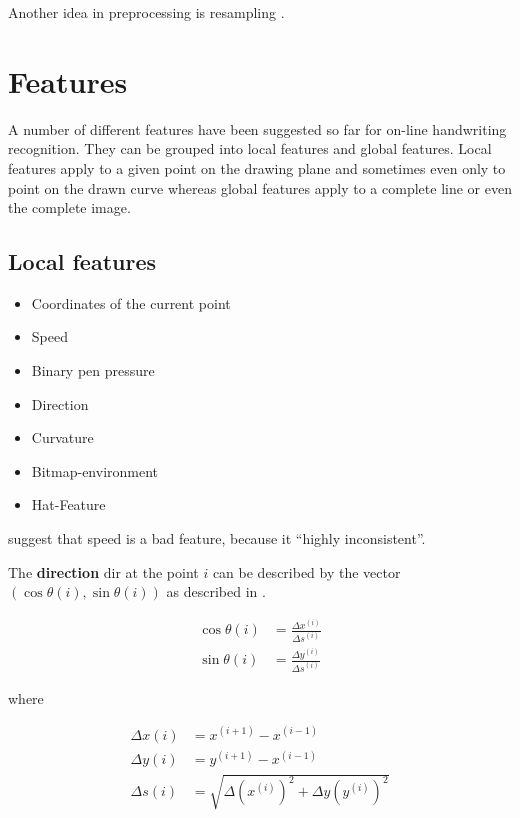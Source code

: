 Another idea in preprocessing is resampling \cite{Guyon1991,ICASSP-94}.

\section{Features}\label{sec:features}
A number of different features have been suggested so far for on-line handwriting
recognition. They can be grouped into local features and global features.
Local features apply to a given point on the drawing plane and sometimes even
only to point on the drawn curve whereas global features apply to a complete
line or even the complete image.

\subsection{Local features}
\begin{itemize}
    \item Coordinates of the current point\cite{Guyon1991}
    \item Speed\cite{Huang09,ICASSP-94}
    \item Binary pen pressure\cite{Kosmala98,Kosmala11,ICASSP-94}
    \item Direction\cite{Manke95,Huang06}
    \item Curvature\cite{Manke95,ICASSP-94,Guyon1991}
    \item Bitmap-environment\cite{Manke95}
    \item Hat-Feature\cite{ICASSP-94,Manke00}
\end{itemize}

\cite{Kosmala98,Kosmala11} suggest that speed is a bad feature, because it \enquote{highly inconsistent}.

The \textbf{direction} $\text{dir}$ at the point $i$ can be described by the vector 
$(\cos \theta(i), \sin \theta(i))$ as described in \cite{Guyon1991}.

\begin{align}
    \cos \theta(i) &= \frac{\Delta x^{(i)}}{\Delta s^{(i)}}\\
    \sin \theta(i) &= \frac{\Delta y^{(i)}}{\Delta s^{(i)}}
\end{align}

where

\begin{align}
    \Delta x (i) &= x^{(i+1)} - x^{(i-1)}\\
    \Delta y (i) &= y^{(i+1)} - x^{(i-1)}\\
    \Delta s (i) &= \sqrt{\Delta (x^{(i)})^2 + \Delta y (y^{(i)})^2}
\end{align}

